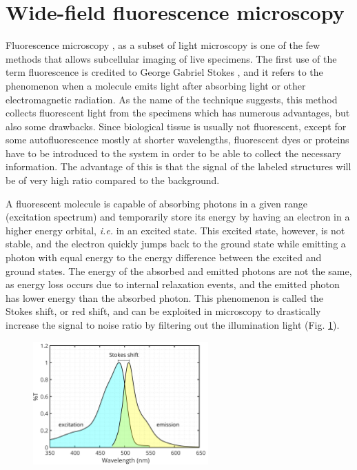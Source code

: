 \section{Wide-field fluorescence microscopy}
  Fluorescence microscopy \cite{lichtman_fluorescence_2005,diaspro_optical_2011}, as a subset of light microscopy is one of the few methods that allows subcellular imaging of live specimens. The first use of the term fluorescence is credited to  George Gabriel Stokes \cite{stokes_change_1852}, and it refers to the phenomenon when a molecule emits light after absorbing light or other electromagnetic radiation. As the name of the technique suggests, this method collects fluorescent light from the specimens which has numerous advantages, but also some drawbacks. Since biological tissue is usually not fluorescent, except for some autofluorescence mostly at shorter wavelengths, fluorescent dyes or proteins have to be introduced to the system in order to be able to collect the necessary information. The advantage of this is that the signal of the labeled structures will be of very high ratio compared to the background.

  A fluorescent molecule is capable of absorbing photons in a given range (excitation spectrum) and temporarily store its energy by having an electron in  a higher energy orbital, \textit{i.e.} in an excited state. This excited state, however, is not stable, and the electron quickly jumps back to the ground state while emitting a photon with equal energy to the energy difference between the excited and ground states. The energy of the absorbed and emitted photons are not the same, as energy loss occurs due to internal relaxation events, and the emitted photon has lower energy than the absorbed photon. This phenomenon is called the Stokes shift, or red shift, and can be exploited in microscopy to drastically increase the signal to noise ratio by filtering out the illumination light (Fig. \ref{fig:spectrum}).

  \begin{figure}
    \centering
    \includegraphics[width=0.6\textwidth]{spectrum/egfp}
    \label{fig:spectrum}
  \end{figure}


